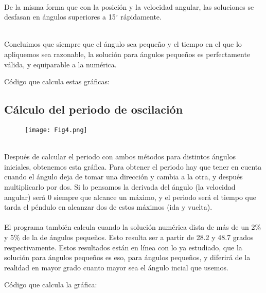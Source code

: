 \documentclass{article}
\begin{document}
\hfill \break \\
De la misma forma que con la posición y la velocidad angular, las soluciones se desfasan en ángulos superiores a 15$^\circ$ rápidamente. 

\hfill \break \\
Concluimos que siempre que el ángulo sea pequeño y el tiempo en el que lo apliquemos sea razonable, la solución para ángulos pequeños es perfectamente válida, y equiparable a la numérica.

\pagebreak
Código que calcula estas gráficas:
\begin{adjustwidth}{-15pt}{-15pt}

\end{adjustwidth}


\subsection{Cálculo del periodo de oscilación}

\begin{wrapfigure}{l}{0.7\textwidth}
\raggedright
\texttt{[image: Fig4.png]}
\end{wrapfigure}

\hfill \break \\   
Después de calcular el periodo con ambos métodos para distintos ángulos iniciales, obtenemos esta gráfica. Para obtener el periodo hay que tener en cuenta cuando el ángulo deja de tomar una dirección y cambia a la otra, y después multiplicarlo por dos. Si lo pensamos la derivada del ángulo (la velocidad angular) será 0 siempre que alcance un máximo, y el periodo será el tiempo que tarda el péndulo en alcanzar dos de estos máximos (ida y vuelta). \\ \\El programa también calcula cuando la solución numérica dista de más de un 2\% y 5\% de la de ángulos pequeños. Esto resulta ser a partir de 28.2 y 48.7 grados respectivamente. Estos resultados están en línea con lo ya estudiado, que la solución para ángulos pequeños es eso, para ángulos pequeños, y diferirá de la realidad en mayor grado cuanto mayor sea el ángulo incial que usemos.

\pagebreak
Código que calcula la gráfica:
\begin{adjustwidth}{-17pt}{-17pt}

\end{adjustwidth}
\pagebreak
\end{document}
